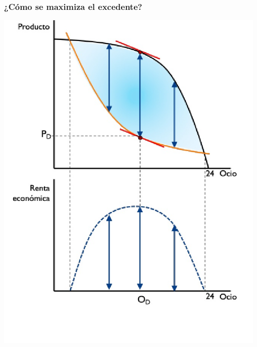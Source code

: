 \documentclass{beamer}
\begin{document}
\begin{frame}
\frametitle{ ¿Cómo se maximiza el excedente?}
\centering
\includegraphics[scale=0.3]{Figures/Tema_04.9_modcap4_4.jpg}
\end{frame}
\end{document}
